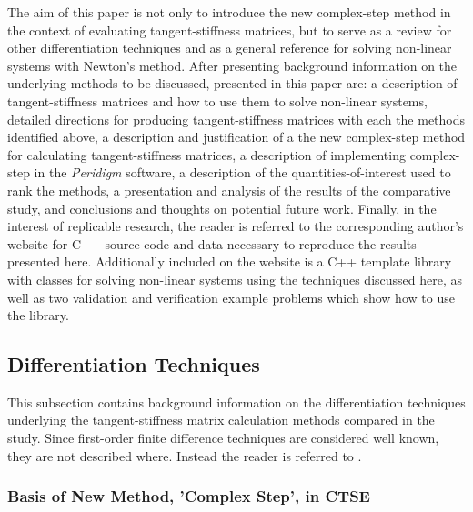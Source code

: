 \documentclass[preprint,12pt]{elsarticle}
\begin{document}
The aim of this paper is not only to introduce the new complex-step method in the context of evaluating tangent-stiffness matrices, but to serve as a review for other differentiation techniques and as a general reference for solving non-linear systems with Newton's method. After presenting background information on the underlying methods to be discussed, presented in this paper are: a description of tangent-stiffness matrices and how to use them to solve non-linear systems, detailed directions for producing tangent-stiffness matrices with each the methods identified above, a description and justification of a the new complex-step method for calculating tangent-stiffness matrices, a description of implementing complex-step in the \emph{Peridigm} software, a description of the quantities-of-interest used to rank the methods, a presentation and analysis of the results of the comparative study, and conclusions and thoughts on potential future work. Finally, in the interest of replicable research, the reader is referred to the corresponding author's website for C++ source-code and data necessary to reproduce the results presented here. Additionally included on the website is a C++ template library with classes for solving non-linear systems using the techniques discussed here, as well as two validation and verification example problems which show how to use the library.

\subsection{Differentiation Techniques}

This subsection contains background information on the differentiation techniques underlying the
tangent-stiffness matrix calculation methods compared in the study. Since first-order finite
difference techniques are considered well known, they are not described where. Instead the
reader is referred to \cite[Chap. 4.1.3]{chapra2010}.

\subsubsection{Basis of New Method, 'Complex Step', in CTSE}  
\end{document}

